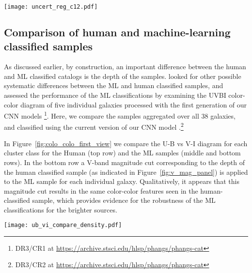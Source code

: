 \documentclass[]{aastex631}
\begin{document}
\begin{figure*} 
\texttt{[image: uncert\_reg\_c12.pdf]}
 \caption{Mean color uncertainties for the NUV-B vs V-I (top row) and U-B vs V-I (bottom row) diagrams. We present class 1+2 clusters for ML (left two panels) and human classifications (right two panels) separately. The maps show the mean uncertainty in each bin, and only bins with at least 5 clusters are displayed. }
 \label{fig:color_color_uncert}
\end{figure*}

\subsection{Comparison of human and machine-learning classified samples}\label{ssect:cc_compare}
As discussed earlier, by construction, an important difference between the human and ML classified catalogs is the depth of the samples.
\citet{whitmore_star_2021} looked for other possible systematic differences between the ML and human classified samples, and assessed the performance of the ML classifications by examining the UVBI color-color diagram of five individual galaxies processed with the first generation of our CNN models \citep{wei_deep_2020}\footnote{DR3/CR1 at \url{https://archive.stsci.edu/hlsp/phangs/phangs-cat}}.
Here, we compare the samples aggregated over all 38 galaxies, and classified using the current version of our CNN model \citep{hannon_star_2023}.\footnote{DR3/CR2 at \url{https://archive.stsci.edu/hlsp/phangs/phangs-cat}} 

In Figure~\ref{fig:colo_colo_first_view} we compare the U-B vs V-I diagram for each cluster class for the Human (top row) and the ML samples (middle and bottom rows).
In the bottom row a V-band magnitude cut corresponding to the depth of the human classified sample (as indicated in Figure~\ref{fig:v_mag_panel}) is applied to the ML sample for each individual galaxy. Qualitatively, it appears that this magnitude cut results in the same color-color features seen in the human-classified sample, which provides evidence for the robustness of the ML classifications for the brighter sources. 
%
\begin{figure*} 
\texttt{[image: ub\_vi\_compare\_density.pdf]}
 \caption{Color-color diagrams for the Human cluster sample (top row) and the ML cluster sample (middle and bottom rows). In the middle row we show all ML classified clusters, whereas the bottom row only shows ML classified clusters up to the same V-band magnitude for each target as detected for the human sample. The individual V-band cuts are estimated with the maximal detected magnitude as presented in Figure~\ref{fig:v_mag_panel}. Cluster classes 1, 2, 1+2 and class 3 compact associations are shown individually in each column from left to right, respectively. Clusters are represented by black dots and in crowded regions by a Gaussian-smoothed heat map indicating the relative density.}
 \label{fig:colo_colo_first_view}
\end{figure*}
%
\end{document}
